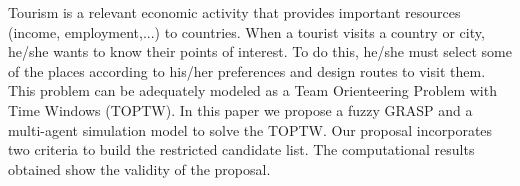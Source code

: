 
Tourism is a relevant economic activity that provides important resources (income, employment,...) to countries. When a tourist visits a country or city, he/she wants to know their points of interest. To do this, he/she must select some of the places according to his/her preferences and design routes to visit them. This problem can be adequately modeled as a Team Orienteering Problem with Time Windows (TOPTW). In this paper we propose a fuzzy GRASP and a multi-agent simulation model to solve the TOPTW. Our proposal incorporates two criteria to build the restricted candidate list. The computational results obtained show the validity of the proposal.

